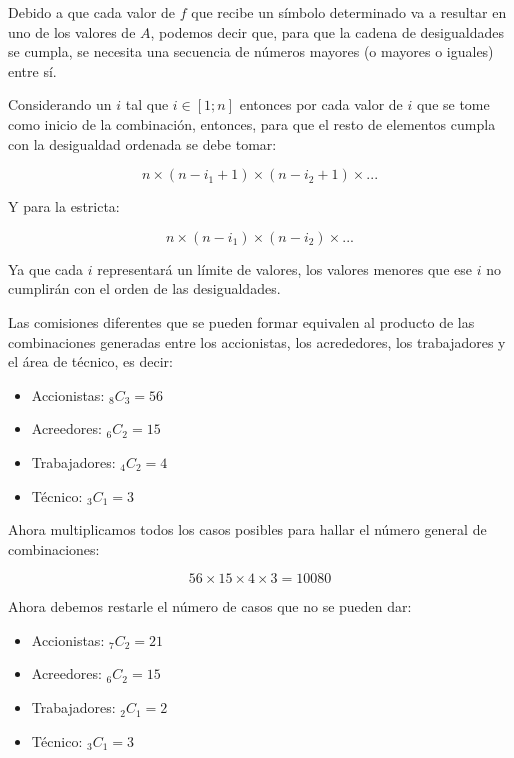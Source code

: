 \documentclass{article}
\begin{document}

Debido a que cada valor de $f$ que recibe un símbolo determinado va a resultar en uno de los valores de $A$, podemos decir que, para que la cadena de desigualdades se cumpla, se necesita una secuencia de números mayores (o mayores o iguales) entre sí.

Considerando un $i$ tal que $i \in [1; n]$ entonces por cada valor de $i$ que se tome como inicio de la combinación, entonces, para que el resto de elementos cumpla con la desigualdad ordenada se debe tomar:

$$n \times (n - i_1 + 1) \times (n - i_2 + 1) \times ...$$

Y para la estricta:

$$n \times (n - i_1) \times (n - i_2) \times ...$$

Ya que cada $i$ representará un límite de valores, los valores menores que ese $i$ no cumplirán con el orden de las desigualdades.


Las comisiones diferentes que se pueden formar equivalen al producto de las combinaciones generadas entre los accionistas, los acrededores, los trabajadores y el área de técnico, es decir:

\begin{itemize}
    \item Accionistas: $_8C_3 = 56$
    \item Acreedores: $_6C_2 = 15$
    \item Trabajadores: $_4C_2 = 4$
    \item Técnico: $_3C_1 = 3$
\end{itemize}

Ahora multiplicamos todos los casos posibles para hallar el número general de combinaciones:

$$56 \times 15 \times 4 \times 3 = 10080$$

Ahora debemos restarle el número de casos que no se pueden dar:

\begin{itemize}
    \item Accionistas: $_7C_2 = 21$
    \item Acreedores: $_6C_2 = 15$
    \item Trabajadores: $_2C_1 = 2$
    \item Técnico: $_3C_1 = 3$
\end{itemize}
\end{document}
